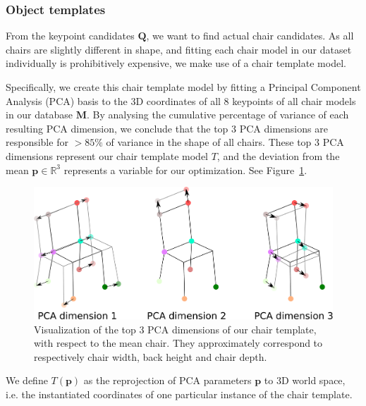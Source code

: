 \documentclass[10pt,twocolumn,letterpaper]{article}
\newcommand{\bb}[1]{{\bm{#1}}}
\begin{document}
%
%
\subsubsection{Object templates}
From the keypoint candidates $\bb{Q}$, we want to find actual chair
candidates. As all chairs are slightly different in shape, and fitting each
chair model in our dataset individually is prohibitively expensive, we make use
of a chair template model.

Specifically, we create this chair template model by fitting a Principal
Component Analysis (PCA) basis to the 3D coordinates of all 8 keypoints of all
chair models in our database $\bb{M}$.  By analysing the cumulative
percentage of variance of each resulting PCA dimension, we conclude that the
top 3 PCA dimensions are responsible for $>85\%$ of variance in the shape of
all chairs. These top 3 PCA dimensions represent our chair template model $T$, and
the deviation from the mean $\bb{p} \in \mathbb{R}^3$ represents a variable for our optimization.
See Figure~\ref{fig:ch4:pca_dimensions}.

\begin{figure}[h!tb]
    \includegraphics[width=\linewidth]{figures/pca_dimensions/pca_dimensions}
    \caption[Template PCA]{Visualization of the top 3 PCA dimensions of our chair template, with respect to the mean chair. They approximately correspond to respectively chair width, back height and chair depth.}
    \label{fig:ch4:pca_dimensions}
\end{figure}

We define $T(\bb{p})$ as the reprojection of PCA parameters $\bb{p}$ to 3D world space, i.e.
the instantiated coordinates of one particular instance of the chair template.
\end{document}
